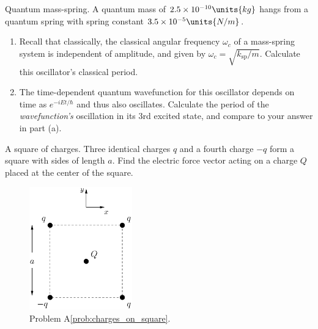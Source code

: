 \begin{aproblem}{Quantum mass-spring.}  
  A quantum mass of $2.5 \times 10^{-10}\units{kg}$ hangs from a
  quantum spring with spring constant $3.5 \times 10^{-5}\units{N/m}$.

  \begin{enumerate}
  \item Recall that classically, the classical angular frequency
    $\omega_c$ of a mass-spring system is independent of amplitude,
    and given by $\omega_c = \sqrt{k_\text{sp}/m}$.  Calculate this
    oscillator's classical period.

  \item The time-dependent quantum wavefunction for this oscillator
    depends on time as $e^{- iEt/\hbar}$ and thus also oscillates.
    Calculate the period of the \textit{wavefunction's} oscillation in
    its 3rd excited state, and compare to your answer in part (a).
  \end{enumerate}
\end{aproblem}


\begin{aproblem}{A square of charges.}
  Three identical charges $q$ and a fourth charge $-q$ form a square
  with sides of length $a$.  Find the electric force vector acting on
  a charge $Q$ placed at the center of the square.
  \label{prob:charges_on_square}

  \begin{figure}[h]
    \begin{center}
      \includegraphics[width=1.75in]{additional_problems/charges_on_square}
    \end{center}
    \caption{Problem A\ref{prob:charges_on_square}.}
  \end{figure}
\end{aproblem}

\newpage

